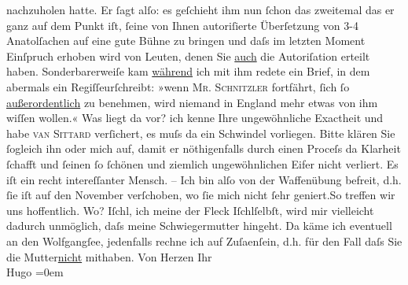 \begin{ledgroupsized}[t]{13cm}
               nachzuholen hatte. Er ſagt alſo: es geſchieht ihm nun ſchon das zweitemal das er ganz
               auf dem Punkt iſt, ſeine von Ihnen autoriſierte Überſetzung von 3-4 Anatolſachen auf eine {\pb}gute Bühne zu bringen und daſs im
               letzten Moment Einſpruch erhoben wird von Leuten, denen Sie \uline{auch} die Autoriſation erteilt haben. Sonderbarerweiſe kam \uline{während} ich mit ihm redete ein Brief, in dem abermals ein
                  Regiſſeurſchreibt: »wenn \textsc{Mr.
                  Schnitzler} fortfährt, ſich ſo \uline{außerordentlich}
               zu benehmen, wird niemand in England mehr etwas von
               ihm wiſſen {\pb}wollen.« Was liegt da
               vor? ich kenne Ihre ungewöhnliche Exactheit und habe \textsc{van Sittard} verſichert, es muſs da ein
               Schwindel vorliegen. Bitte klären Sie ſogleich ihn oder mich auf, damit er
               nöthigenfalls durch einen Proceſs da Klarheit ſchafft und ſeinen ſo ſchönen und
               ziemlich ungewöhnlichen Eifer nicht verliert. Es iſt ein recht intereſſanter
               Mensch.\pend
           \pstart
           \centering{}{\pb}–\pend
           \pstart
           \noindent{}Ich bin alſo von der Waffenübung befreit, d.h. ſie iſt auf den November
               verſchoben, wo ſie mich nicht ſehr geniert.\hspace*{1.5em}So
               treffen wir uns hoffentlich. Wo? Iſchl, ich meine
               der Fleck Iſchlſelbſt, wird mir vielleicht dadurch unmöglich, daſs
               meine Schwiegermutter hingeht.
               Da käme ich eventuell an den Wolfgangſee,
               jedenfalls rechne ich auf Zuſa{\geminationm}enſein, d.h. für den Fall
               daſs Sie die Mutter\uline{nicht} mithaben.\pend
           \pstart
           Von Herzen Ihr{\\[\baselineskip]}\spacefill\mbox{Hugo}\pend
           \leftskip=0em{}\endnumbering{}\end{ledgroupsized}  \newcommand{\dateiname}{L01426}\newcommand{\titel}{Hugo von Hofmannsthal an Arthur Schnitzler, 12. 8. 1904}\newcommand{\editorInnen}{Martin Anton Müller und Gerd-Hermann Susen}
      
